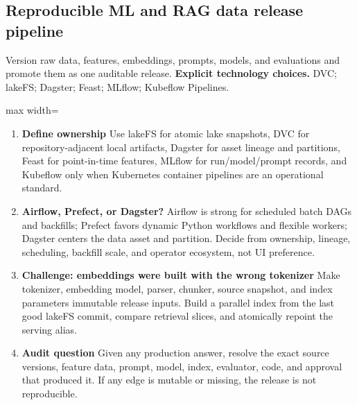 \subsection{Reproducible ML and RAG data release pipeline}
Version raw data, features, embeddings, prompts, models, and evaluations and promote them as one auditable release.
\textbf{Explicit technology choices.} DVC; lakeFS; Dagster; Feast; MLflow; Kubeflow Pipelines.
\begin{center}\begin{adjustbox}{max width=\linewidth}\end{adjustbox}\end{center}
\begin{enumerate}
\item \textbf{Define ownership} Use lakeFS for atomic lake snapshots, DVC for repository-adjacent local artifacts, Dagster for asset lineage and partitions, Feast for point-in-time features, MLflow for run/model/prompt records, and Kubeflow only when Kubernetes container pipelines are an operational standard.
\item \textbf{Airflow, Prefect, or Dagster?} Airflow is strong for scheduled batch DAGs and backfills; Prefect favors dynamic Python workflows and flexible workers; Dagster centers the data asset and partition. Decide from ownership, lineage, scheduling, backfill scale, and operator ecosystem, not UI preference.
\item \textbf{Challenge: embeddings were built with the wrong tokenizer} Make tokenizer, embedding model, parser, chunker, source snapshot, and index parameters immutable release inputs. Build a parallel index from the last good lakeFS commit, compare retrieval slices, and atomically repoint the serving alias.
\item \textbf{Audit question} Given any production answer, resolve the exact source versions, feature data, prompt, model, index, evaluator, code, and approval that produced it. If any edge is mutable or missing, the release is not reproducible.
\end{enumerate}
